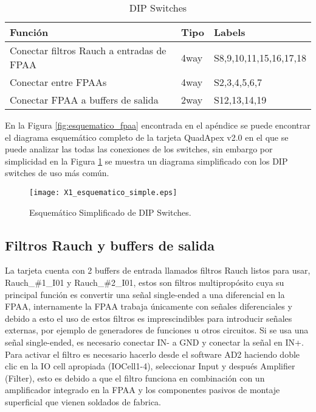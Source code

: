	\begin{table}[!ht]
		\centering
		\begin{tabular}{|l|l|l|}
			\hline
			\textbf{Función} &  \textbf{Tipo} & \textbf{Labels}\\
			\hline
			Conectar filtros Rauch a entradas de FPAA 					& 4way 		& S8,9,10,11,15,16,17,18		\\
			\hline
			Conectar entre FPAAs 										& 4way 		& S2,3,4,5,6,7					\\
			\hline
			Conectar FPAA a buffers de salida 							& 2way 		& S12,13,14,19					\\
			\hline
		\end{tabular}
		\caption{DIP Switches}
		\label{tab:switches}
	\end{table}
	
	En la Figura \ref{fig:esquematico_fpaa} encontrada en el apéndice se puede encontrar el diagrama esquemático completo de la tarjeta QuadApex v2.0 en el que se puede analizar las todas las conexiones de los switches, sin embargo por simplicidad en la Figura \ref{fig:X1_esquematico_simple} se muestra un diagrama simplificado con los DIP switches de uso más común.
	
	\begin{figure}[!ht] 
		\caption{Esquemático Simplificado de DIP Switches.}
		\label{fig:X1_esquematico_simple}
		\centering
		\texttt{[image: X1\_esquematico\_simple.eps]}
	\end{figure}
	
		\subsection{Filtros Rauch y buffers de salida}
	
	La tarjeta cuenta con 2 buffers de entrada llamados filtros Rauch listos para usar, Rauch\_\#1\_I01 y Rauch\_\#2\_I01, estos son filtros multipropósito cuya su principal función es convertir una señal single-ended a una diferencial en la FPAA, internamente la FPAA trabaja únicamente con señales diferenciales y debido a esto el uso de estos filtros es imprescindibles para introducir señales externas, por ejemplo de generadores de funciones u otros circuitos. Si se usa una señal single-ended, es necesario conectar IN- a GND y conectar la señal en IN+.
	Para activar el filtro es necesario hacerlo desde el software AD2 haciendo doble clic en la IO cell apropiada (IOCell1-4), seleccionar Input y después Amplifier (Filter), esto es debido a que el filtro funciona en combinación con un amplificador integrado en la FPAA y los componentes pasivos de montaje superficial que vienen soldados de fabrica.
	
